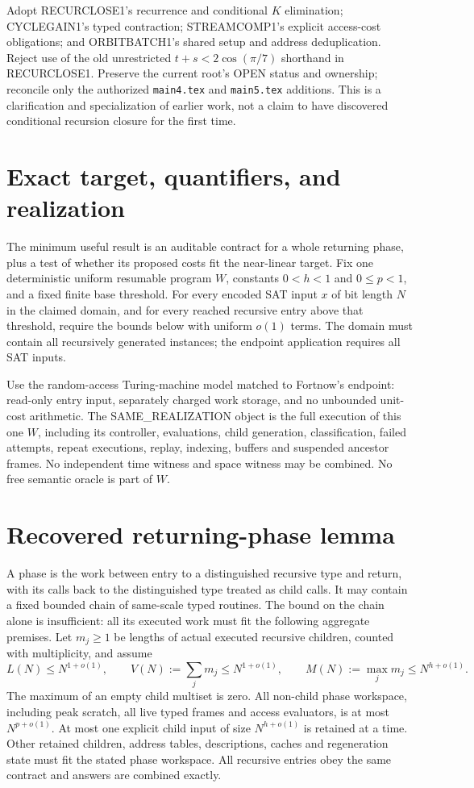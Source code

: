 \documentclass[11pt]{article}
\begin{document}
Adopt RECURCLOSE1's recurrence and conditional $K$ elimination; CYCLEGAIN1's
typed contraction; STREAMCOMP1's explicit access-cost obligations; and
ORBITBATCH1's shared setup and address deduplication. Reject use of the old
unrestricted $t+s<2\cos(\pi/7)$ shorthand in RECURCLOSE1. Preserve the
current root's OPEN status and ownership; reconcile only the authorized
\nolinkurl{main4.tex} and \nolinkurl{main5.tex} additions. This is a
clarification and specialization of earlier work, not a claim to have
discovered conditional recursion closure for the first time.

\section*{Exact target, quantifiers, and realization}
The minimum useful result is an auditable contract for a whole returning
phase, plus a test of whether its proposed costs fit the near-linear target.
Fix one deterministic uniform resumable program $W$, constants $0<h<1$
and $0\le p<1$, and a fixed finite base threshold. For every encoded SAT
input $x$ of bit length $N$ in the claimed domain, and for every reached
recursive entry above that threshold, require the bounds below with
uniform $o(1)$ terms. The domain must contain all recursively generated
instances; the endpoint application requires all SAT inputs.

Use the random-access Turing-machine model matched to Fortnow's endpoint:
read-only entry input, separately charged work storage, and no unbounded
unit-cost arithmetic. The SAME\_REALIZATION object is the full execution
of this one $W$, including its controller, evaluations, child generation,
classification, failed attempts, repeat executions, replay, indexing,
buffers and suspended ancestor frames. No independent time witness and
space witness may be combined. No free semantic oracle is part of $W$.

\section*{Recovered returning-phase lemma}
A phase is the work between entry to a distinguished recursive type and
return, with its calls back to the distinguished type treated as child
calls. It may contain a fixed bounded chain of same-scale typed routines.
The bound on the chain alone is insufficient: all its executed work must
fit the following aggregate premises. Let $m_j\ge1$ be lengths of actual
executed recursive children, counted with multiplicity, and assume
\[
 L(N)\le N^{1+o(1)},\qquad
 V(N):=\sum_j m_j\le N^{1+o(1)},\qquad
 M(N):=\max_jm_j\le N^{h+o(1)}.
\]
The maximum of an empty child multiset is zero. All non-child phase
workspace, including peak scratch, all live typed frames and access
evaluators, is at most $N^{p+o(1)}$. At most one explicit child input of
size $N^{h+o(1)}$ is retained at a time. Other retained children, address
tables, descriptions, caches and regeneration state must fit the stated
phase workspace. All recursive entries obey the same contract and answers
are combined exactly.
\end{document}
